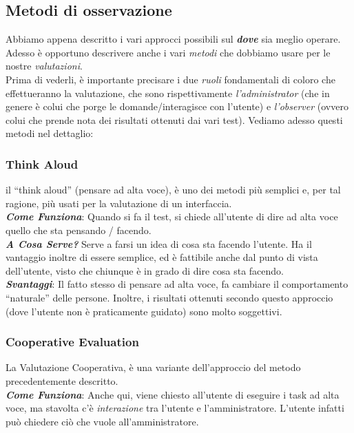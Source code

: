 \documentclass[oneside]{book}
\begin{document}
		\subsection{Metodi di osservazione} \label{MetodiDiOsservazione}
			Abbiamo appena descritto i vari approcci possibili sul \textbf{\emph{dove}} sia meglio operare. Adesso è opportuno descrivere anche i vari \emph{metodi} che dobbiamo usare per le nostre \emph{valutazioni}. \\
			Prima di vederli, è importante precisare i due \emph{ruoli} fondamentali di coloro che effettueranno la valutazione, che sono rispettivamente \emph{l'administrator} (che in genere è colui che porge le domande/interagisce con l'utente) e \emph{l'observer} (ovvero colui che prende nota dei risultati ottenuti dai vari test). Vediamo adesso questi metodi nel dettaglio:

			\subsubsection{Think Aloud}
				il ``think aloud'' (pensare ad alta voce), è uno dei metodi più semplici e, per tal ragione, più usati per la valutazione di un interfaccia. \\

				\textbf{\emph{Come Funziona}}: Quando si fa il test, si chiede all'utente di dire ad alta voce quello che sta pensando / facendo. \\

				\textbf{\emph{A Cosa Serve?}} Serve a farsi un idea di cosa sta facendo l'utente. Ha il vantaggio inoltre di essere semplice, ed è fattibile anche dal punto di vista dell'utente, visto che chiunque è in grado di dire cosa sta facendo.\\

				\textbf{\emph{Svantaggi}}: Il fatto stesso di pensare ad alta voce, fa cambiare il comportamento ``naturale'' delle persone. Inoltre, i risultati ottenuti secondo questo approccio (dove l'utente non è praticamente guidato) sono molto soggettivi.

			\subsubsection{Cooperative Evaluation}
				La Valutazione Cooperativa, è una variante dell'approccio del metodo precedentemente descritto. \\

				\textbf{\emph{Come Funziona}}: Anche qui, viene chiesto all'utente di eseguire i task ad alta voce, ma stavolta c'è \emph{interazione} tra l'utente e l'amministratore. L'utente infatti può chiedere ciò che vuole all'amministratore. \\
\end{document}
